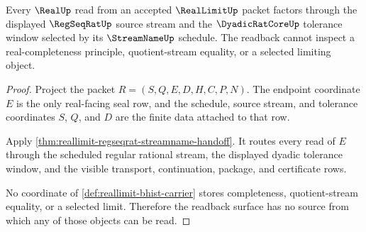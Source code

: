 \begin{theorem}
\label{thm:reallimit-readback-obligation}
Every $\RealUp$ read from an accepted $\RealLimitUp$ packet factors through the
displayed $\RegSeqRatUp$ source stream and the $\DyadicRatCoreUp$ tolerance
window selected by its $\StreamNameUp$ schedule. The readback cannot inspect a
real-completeness principle, quotient-stream equality, or a selected limiting
object.
\end{theorem}
\begin{proof}
Project the packet $R=(S,Q,E,D,H,C,P,N)$. The endpoint coordinate $E$ is the
only real-facing seal row, and the schedule, source stream, and tolerance
coordinates $S$, $Q$, and $D$ are the finite data attached to that row.

Apply \autoref{thm:reallimit-regseqrat-streamname-handoff}. It routes every
read of $E$ through the scheduled regular rational stream, the displayed
dyadic tolerance window, and the visible transport, continuation, package, and
certificate rows.

No coordinate of \autoref{def:reallimit-bhist-carrier} stores completeness,
quotient-stream equality, or a selected limit. Therefore the readback surface
has no source from which any of those objects can be read.
\end{proof}

